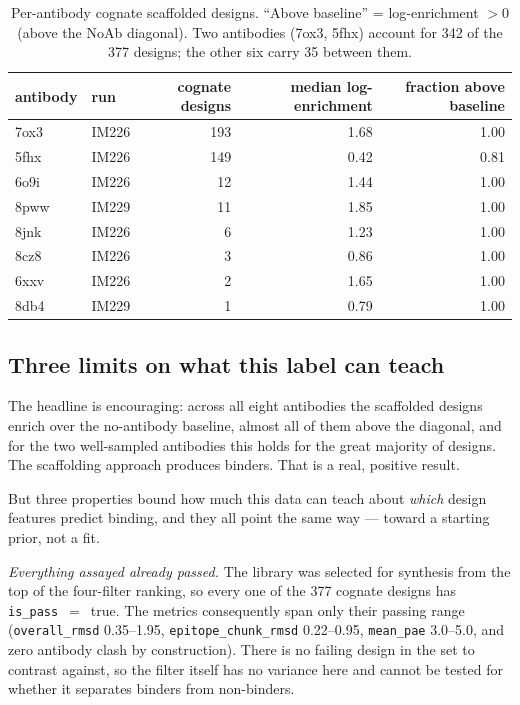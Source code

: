 \begin{table}[h]\centering
\begin{tabular}{llrrr}
\toprule
antibody & run & cognate designs & median log-enrichment & fraction above baseline \\
\midrule
7ox3 & IM226 & 193 & 1.68 & 1.00 \\
5fhx & IM226 & 149 & 0.42 & 0.81 \\
6o9i & IM226 &  12 & 1.44 & 1.00 \\
8pww & IM229 &  11 & 1.85 & 1.00 \\
8jnk & IM226 &   6 & 1.23 & 1.00 \\
8cz8 & IM226 &   3 & 0.86 & 1.00 \\
6xxv & IM226 &   2 & 1.65 & 1.00 \\
8db4 & IM229 &   1 & 0.79 & 1.00 \\
\bottomrule
\end{tabular}
\caption{Per-antibody cognate scaffolded designs. ``Above baseline'' = log-enrichment $>0$
(above the NoAb diagonal). Two antibodies (7ox3, 5fhx) account for \num{342} of the \num{377}
designs; the other six carry \num{35} between them.}
\label{tab:dp3binding}
\end{table}

\subsection{Three limits on what this label can teach}
The headline is encouraging: across all eight antibodies the scaffolded designs enrich over the
no-antibody baseline, almost all of them above the diagonal, and for the two well-sampled
antibodies this holds for the great majority of designs. The scaffolding approach produces
binders. That is a real, positive result.

But three properties bound how much this data can teach about \emph{which} design features
predict binding, and they all point the same way --- toward a starting prior, not a fit.

\emph{Everything assayed already passed.} The library was selected for synthesis from the
top of the four-filter ranking, so every one of the \num{377} cognate designs has
\texttt{is\_pass}~$=$~true. The metrics consequently span only their passing range
(\texttt{overall\_rmsd} \numrange{0.35}{1.95}, \texttt{epitope\_chunk\_rmsd} \numrange{0.22}{0.95},
\texttt{mean\_pae} \numrange{3.0}{5.0}, and zero antibody clash by construction). There is no
failing design in the set to contrast against, so the filter itself has no variance here and
cannot be tested for whether it separates binders from non-binders.

